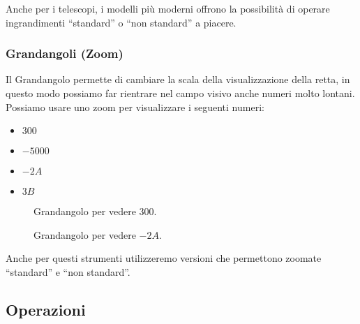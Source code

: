 Anche per i telescopi, i modelli più moderni offrono la possibilità di 
operare 
ingrandimenti ``standard'' o ``non standard'' a piacere.

\subsubsection{Grandangoli (Zoom)}
\label{subsec:insnum_microscopio}

Il Grandangolo permette di cambiare la scala della visualizzazione della 
retta, 
in questo modo possiamo far rientrare nel campo visivo anche numeri molto 
lontani.
Possiamo usare uno zoom per visualizzare i seguenti numeri:

\begin{multicols}{4}
\begin{itemize}[nosep]
 \item $300$
 \item $-5000$
 \item $-2A$
 \item $3B$
\end{itemize}
\end{multicols}
\vspace{-5mm}
\begin{figure}[h]
\begin{inaccessibleblock}

\begin{minipage}{.48\linewidth}
 \begin{center}
\grandangoloa
 \end{center}
\caption{Grandangolo per vedere \(300\).} \label{fig:grandangoloa}
\end{minipage}
\hfill
\begin{minipage}{.48\linewidth}
 \begin{center}
\grandangolob
 \end{center}
\caption{Grandangolo per vedere \(-2A\).} \label{fig:grandangolob}
\end{minipage}

\end{inaccessibleblock}
\end{figure}

Anche per questi strumenti utilizzeremo versioni che permettono zoomate 
``standard'' e ``non standard''.

\subsection{Operazioni}
\label{subsec:insnum_operazioni}

